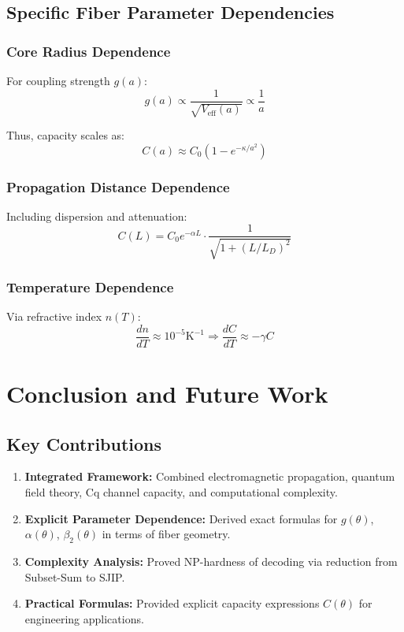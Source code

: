 \documentclass[12pt,a4paper]{article}
\begin{document}
\subsection{Specific Fiber Parameter Dependencies}

\subsubsection{Core Radius Dependence}

For coupling strength $g(a)$:
\begin{equation}
g(a) \propto \frac{1}{\sqrt{V_{\text{eff}}(a)}} \propto \frac{1}{a}
\end{equation}

Thus, capacity scales as:
\begin{equation}
C(a) \approx C_0 \left(1 - e^{-\kappa/a^2}\right)
\end{equation}

\subsubsection{Propagation Distance Dependence}

Including dispersion and attenuation:
\begin{equation}
C(L) = C_0 e^{-\alpha L} \cdot \frac{1}{\sqrt{1 + (L/L_D)^2}}
\end{equation}

\subsubsection{Temperature Dependence}

Via refractive index $n(T)$:
\begin{equation}
\frac{dn}{dT} \approx 10^{-5} \text{K}^{-1} \Rightarrow \frac{dC}{dT} \approx -\gamma C
\end{equation}

\section{Conclusion and Future Work}

\subsection{Key Contributions}

\begin{enumerate}
\item \textbf{Integrated Framework:} Combined electromagnetic propagation, quantum field theory, Cq channel capacity, and computational complexity.
\item \textbf{Explicit Parameter Dependence:} Derived exact formulas for $g(\theta)$, $\alpha(\theta)$, $\beta_2(\theta)$ in terms of fiber geometry.
\item \textbf{Complexity Analysis:} Proved NP-hardness of decoding via reduction from Subset-Sum to SJIP.
\item \textbf{Practical Formulas:} Provided explicit capacity expressions $C(\theta)$ for engineering applications.
\end{enumerate}
\end{document}
